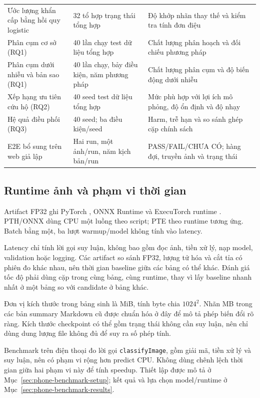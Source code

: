 \begin{longtable}{P{.28\textwidth}P{.30\textwidth}P{.31\textwidth}}
Ước lượng khẩn cấp bằng hồi quy logistic & 32 tổ hợp trạng thái tổng hợp & Độ khớp nhãn thay thế và kiểm tra tính đơn điệu \\
Phân cụm cơ sở (RQ1) & 40 lần chạy test dữ liệu tổng hợp & Chất lượng phân hoạch và đối chiếu phương pháp \\
Phân cụm dưới nhiễu và bản sao (RQ1) & 40 lần chạy, bảy điều kiện, năm phương pháp & Chất lượng phân cụm và độ biến động dưới nhiễu \\
Xếp hạng ưu tiên cứu hộ (RQ2) & 40 seed test dữ liệu tổng hợp & Mức phù hợp với lợi ích mô phỏng, độ ổn định và độ nhạy \\
Hệ quả điều phối (RQ3) & 40 seed; ba điều kiện/seed & Harm, trễ hạn và so sánh ghép cặp chính sách \\
E2E bổ sung trên web giả lập & Hai run, một ảnh/run, năm kịch bản/run & PASS/FAIL/CHƯA CÓ; hàng đợi, truyền ảnh và trạng thái \\
\bottomrule
\end{longtable}

\subsection{Runtime ảnh và phạm vi thời gian}
Artifact FP32 ghi PyTorch \BenchmarkPytorchVersion{}, ONNX Runtime \BenchmarkOnnxVersion{} và ExecuTorch runtime \BenchmarkExecutorchVersion{}. PTH/ONNX dùng CPU một luồng theo script; PTE theo runtime tương ứng. Batch bằng một, ba lượt warmup/model không tính vào latency.

Latency chỉ tính lời gọi suy luận, không bao gồm đọc ảnh, tiền xử lý, nạp model, validation hoặc logging. Các artifact so sánh FP32, lượng tử hóa và cắt tỉa có phiên đo khác nhau, nên thời gian baseline giữa các bảng có thể khác. Đánh giá tốc độ phải dùng cặp trong cùng bảng, cùng runtime, thay vì lấy baseline nhanh nhất ở một bảng so với candidate ở bảng khác.

Đơn vị kích thước trong bảng sinh là MiB, tính byte chia $1024^2$. Nhãn MB trong các bản summary Markdown cũ được chuẩn hóa ở đây để mô tả phép biến đổi rõ ràng. Kích thước checkpoint có thể gồm trạng thái không cần suy luận, nên chỉ dùng dung lượng file không đủ để suy ra số phép tính.

Benchmark trên điện thoại đo lời gọi \texttt{classifyImage}, gồm giải mã, tiền xử lý và suy luận, nên có phạm vi rộng hơn predict CPU. Không dùng chênh lệch thời gian giữa hai phạm vi này để tính speedup. Thiết lập được mô tả ở Mục~\ref{sec:phone-benchmark-setup}; kết quả và lựa chọn model/runtime ở Mục~\ref{sec:phone-benchmark-results}.

